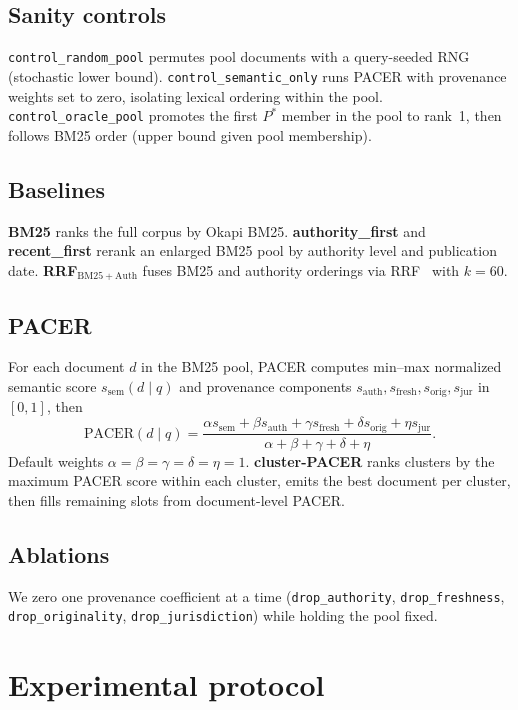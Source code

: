 \documentclass[sigconf,anonymous,review]{acmart}
\begin{document}
\subsection{Sanity controls}
\texttt{control\_random\_pool} permutes pool documents with a query-seeded RNG (stochastic lower bound).
\texttt{control\_semantic\_only} runs PACER with provenance weights set to zero, isolating lexical ordering within the pool.
\texttt{control\_oracle\_pool} promotes the first $P^\ast$ member in the pool to rank~1, then follows BM25 order (upper bound given pool membership).

\subsection{Baselines}
\textbf{BM25} ranks the full corpus by Okapi BM25.
\textbf{authority\_first} and \textbf{recent\_first} rerank an enlarged BM25 pool by authority level and publication date.
\textbf{RRF}$_{\mathrm{BM25+Auth}}$ fuses BM25 and authority orderings via RRF~\cite{cormack2009rrf} with $k{=}60$.

\subsection{PACER}
For each document $d$ in the BM25 pool, PACER computes min--max normalized semantic score $s_{\mathrm{sem}}(d\mid q)$ and provenance components $s_{\mathrm{auth}}, s_{\mathrm{fresh}}, s_{\mathrm{orig}}, s_{\mathrm{jur}}$ in $[0,1]$, then
\begin{equation}
\label{eq:pacer}
\mathrm{PACER}(d\mid q) = \frac{\alpha s_{\mathrm{sem}} + \beta s_{\mathrm{auth}} + \gamma s_{\mathrm{fresh}} + \delta s_{\mathrm{orig}} + \eta s_{\mathrm{jur}}}{\alpha+\beta+\gamma+\delta+\eta}.
\end{equation}
Default weights $\alpha{=}\beta{=}\gamma{=}\delta{=}\eta{=}1$.
\textbf{cluster-PACER} ranks clusters by the maximum PACER score within each cluster, emits the best document per cluster, then fills remaining slots from document-level PACER.

\subsection{Ablations}
We zero one provenance coefficient at a time (\texttt{drop\_authority}, \texttt{drop\_freshness}, \texttt{drop\_originality}, \texttt{drop\_jurisdiction}) while holding the pool fixed.

\section{Experimental protocol}
\label{sec:protocol}
\end{document}
